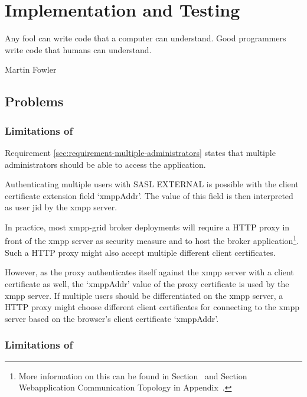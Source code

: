 \chapter{Implementation and Testing} %
\epigraph{Any fool can write code that a computer can understand. Good programmers write code that humans can understand.}{Martin Fowler}

\section{Problems}

\subsection{Limitations of \emph{}}\label{sec:limitations-of-requirement-multiple-administrators}

Requirement \ref{sec:requirement-multiple-administrators} states that multiple administrators should be able to access the application.

Authenticating multiple users with SASL EXTERNAL is possible with the client certificate extension field `xmppAddr'.
The value of this field is then interpreted as user \gls{jid} by the \gls{xmpp} server.

In practice, most \gls{xmpp-grid} \gls{broker} deployments will require a HTTP proxy in front of the \gls{xmpp} server as security measure and to host the \gls{broker} application\footnote{
More information on this can be found in Section~ and Section Webapplication Communication Topology in Appendix~.}.
Such a HTTP proxy might also accept multiple different client certificates.

However, as the proxy authenticates itself against the \gls{xmpp} server with a client certificate as well, the `xmppAddr' value of the proxy certificate is used by the \gls{xmpp} server.
If multiple users should be differentiated on the \gls{xmpp} server, a HTTP proxy might choose different client certificates for connecting to the \gls{xmpp} server based on the browser's client certificate `xmppAddr'.


\subsection{Limitations of \emph{}}

